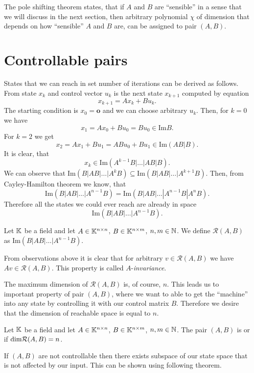 The pole shifting theorem states, that if $A$ and $B$ are ``sensible'' in a sense that we will discuss in the next section, then arbitrary polynomial $\chi$ of dimension that depends on how ``sensible'' $A$ and $B$ are, can be assigned to pair $(A,B)$.

\section{Controllable pairs}

States that we can reach in set number of iterations can be derived as follows. From state $x_k$ and control vector $u_k$ is the next state $x_{k+1}$ computed by equation $$x_{k+1}=Ax_k+Bu_k.$$ The starting condition is $x_0=\textbf{o}$ and we can choose arbitrary $u_k$. Then, for $k=0$ we have $$x_1=Ax_0+Bu_0=Bu_0 \in \text{Im}B.$$ For $k=2$ we get $$x_2=Ax_1+Bu_1=ABu_0+Bu_1\in\text{Im}(AB|B).$$ It is clear, that $$x_k\in\text{Im}(A^{k-1}B|\ldots|AB|B).$$ We can observe that $\text{Im}(B|AB|\ldots|A^kB) \subseteq \text{Im}(B|AB|\ldots|A^{k+1}B)$. Then, from Cayley-Hamilton theorem we know, that $$\text{Im}(B|AB|\ldots|A^{n-1}B)=\text{Im}(B|AB|\ldots|A^{n-1}B|A^nB).$$ Therefore all the states we could ever reach are already in space $$\text{Im}(B|AB|\ldots|A^{n-1}B).$$

\begin{definition}
	Let $\mathbb{K}$ be a field and let $A \in \mathbb{K}^{n \times n}$, $B \in \mathbb{K}^{n \times m}$, $n,m \in \mathbb{N}$. We define $\mathcal{R}(A,B)$ as $\text{Im}(B|AB|\ldots|A^{n-1}B)$.
\end{definition}

From observations above it is clear that for arbitrary $v\in\mathcal{R}(A,B)$ we have $Av\in\mathcal{R}(A,B)$. This property is called $A$-\textit{invariance}.

The maximum dimension of $\mathcal{R}(A,B)$ is, of course, $n$. This leads us to important property of pair $(A,B)$, where we want to able to get the ``machine'' into any state by controlling it with our control matrix $B$. Therefore we desire that the dimension of reachable space is equal to $n$. 

\begin{definition}
	Let $\mathbb{K}$ be a field and let $A \in \mathbb{K}^{n \times n}$, $B \in \mathbb{K}^{n \times m}$, $n,m \in \mathbb{N}$. The pair $(A,B)$ is  or  if $\textnormal{dim}\mathcal{R}(A,B)=n$.
\end{definition}

If $(A,B)$ are not controllable then there exists subspace of our state space that is not affected by our input. This can be shown using following theorem.

